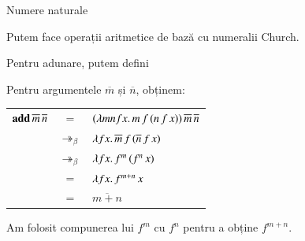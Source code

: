\documentclass[xcolor=pdftex,romanian,colorlinks]{beamer}
\begin{document}
\begin{frame}{Numere naturale}

\begin{center}
\end{center}

\vspace{-.2cm}

Putem face operații aritmetice de bază cu numeralii Church.

Pentru \alert{adunare}, putem defini
\vspace{-.2cm}
\begin{center}
\end{center}

\vspace{-.2cm}
Pentru argumentele $\overline{m}$ și $\overline{n}$, obținem:

\vspace{-.2cm}
\begin{center}
\begin{tabular}{rcl}
$\mathbf{add}\, \overline{m}\, \overline{n}$ & $=$ & $(\lambda mnfx.\,m\, f\, (n\, f\, x))\, \overline{m}\, \overline{n}$ \\
& $\twoheadrightarrow_\beta$ & $\lambda fx.\,\overline{m}\, f\, (\overline{n}\, f\, x)$ \\
& $\twoheadrightarrow_\beta$ & $\lambda fx.\,f^m\, (f^n\, x)$ \\
& $=$ & $\lambda fx.\,f^{m+n}\, x$ \\
& $=$ & $\overline{m+n}$ 
\end{tabular}
\end{center}

\vspace{-.2cm}
Am folosit compunerea lui $f^m$ cu $f^n$ pentru a obține $f^{m+n}$.
\end{frame}
\end{document}
